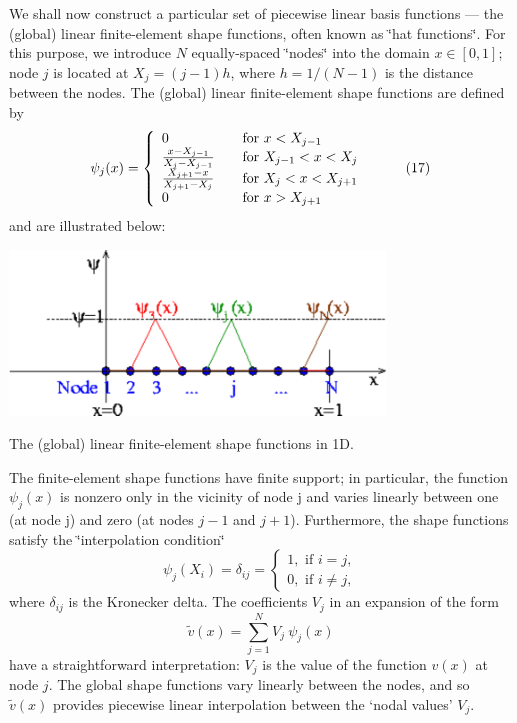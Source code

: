 We shall now construct a particular set of piecewise linear basis functions --- the (global) linear finite-\/element shape functions, often known as \char`\"{}hat functions\char`\"{}. For this purpose, we introduce $N$ equally-\/spaced \char`\"{}nodes\char`\"{} into the domain $ x \in [0,1]$; node $j$ is located at $X_j = (j-1) h $, where $h=1/(N-1)$ is the distance between the nodes. The (global) linear finite-\/element shape functions are defined by \[ \psi_j(x) = \left\{ \begin{array}{ll} 0 & \mbox{\ \ \ for $x < X_{j-1}$} \\ \frac{x-X_{j-1}}{X_j-X_{j-1}} & \mbox{\ \ \ for $ X_{j-1} <x < X_j$} \\ \frac{X_{j+1}-x}{X_{j+1}-X_j} & \mbox{\ \ \ for $ X_{j} <x < X_{j+1}$} \\ 0 & \mbox{\ \ \ for $x > X_{j+1}$} \\ \end{array} \right. \ \ \ \ \ \ \ \ (17) \] and are illustrated below\-:

 
\begin{DoxyImage}
\includegraphics[width=0.75\textwidth]{1Dmesh_with_linear_shape_fcts}
\caption{The (global) linear finite-\/element shape functions in 1\-D. }
\end{DoxyImage}
 The finite-\/element shape functions have finite support; in particular, the function $ \psi_j(x) $ is nonzero only in the vicinity of node j and varies linearly between one (at node j) and zero (at nodes $ j-1 $ and $ j+1 $). Furthermore, the shape functions satisfy the \char`\"{}interpolation condition\char`\"{} \[ \psi_j(X_i) = \delta_{ij} = \left\{\begin{array}{c} 1, \mbox{ if } i=j,\\ 0, \mbox{ if } i\neq j, \end{array}\right. \] where $ \delta_{ij}$ is the Kronecker delta. The coefficients $V_j$ in an expansion of the form \[ \tilde{v}(x) = \sum_{j=1}^{N} V_j \ \psi_j(x)\] have a straightforward interpretation\-: $V_j$ is the value of the function $ v(x) $ at node $ j $. The global shape functions vary linearly between the nodes, and so $ \tilde{v}(x) $ provides piecewise linear interpolation between the `nodal values' $V_j$.

